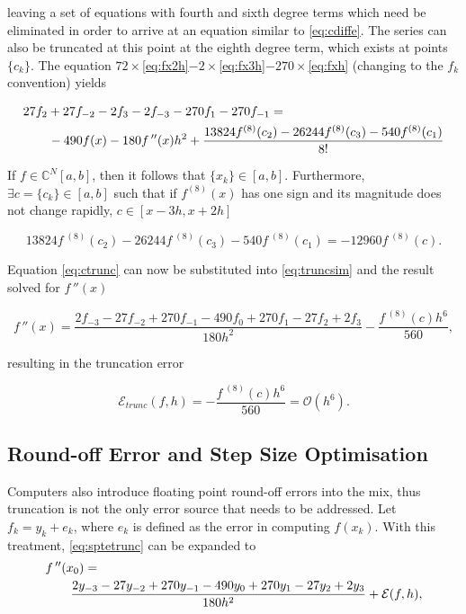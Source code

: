 leaving a set of equations with fourth and sixth degree terms which need be eliminated in order to arrive at an equation similar to \cref{eq:cdiffe}.
The series can also be truncated at this point at the eighth degree term, which exists at points $\{c_k\}$.
The equation $72\times$\cref{eq:fx2h}$-2\times$\cref{eq:fx3h}$-270\times$\cref{eq:fxh} (changing to the $f_k$ convention) yields

{\mathindent=0.2cm
\begin{align}
\MoveEqLeft 27f_{2}+27f_{-2}-2f_{3}-2f_{-3}-270f_{1}-270f_{-1} = \nonumber\\
&-490f(x)-180f\,''(x)h^2+\frac{13824f^{(8)}(c_2)-26244f^{(8)}(c_3)-540f^{(8)}(c_1)}{8!}\label{eq:truncsim}
\end{align}
}

If $f \in \mathds{C}^N [a,b]$, then it follows that $\{x_k\} \in [a,b]$.
Furthermore, $\exists c = \{c_k\} \in [a,b]$ such that if $f^{(8)}(x)$ has one sign and its magnitude does not change rapidly, $c \in [x-3h,x+2h]$

\begin{equation}
 13824f^{\;(8)}(c_2)-26244f^{\;(8)}(c_3)-540f^{\;(8)}(c_1) = -12960f^{\;(8)}(c).\label{eq:ctrunc}
\end{equation}

Equation \cref{eq:ctrunc} can now be substituted into \cref{eq:truncsim} and the result solved for $f\,''(x)$

{\mathindent=0.5cm
\begin{equation}
f\,''(x) = \frac{2f_{-3}-27f_{-2}+270f_{-1}-490f_{0}+270f_{1}-27f_{2}+2f_{3}}{180h^{2}}-\frac{f^{\;(8)}(c)h^6}{560},\label{eq:sptetrunc}
\end{equation}
}

resulting in the truncation error

\begin{equation}
\mathcal{E}_{trunc}(f,h) = -\frac{f^{\;(8)}(c)h^6}{560} = \mathcal{O}(h^6).\label{eq:etrunc}
\end{equation}

\subsection{Round-off Error and Step Size Optimisation}\label{sec:cdiffstep}

Computers also introduce floating point round-off errors into the mix, thus truncation is not the only error source that needs to be addressed.
Let $f_k = y_k +e_k$, where $e_k$ is defined as the error in computing $f(x_k)$. With this treatment, \cref{eq:sptetrunc} can be expanded to
\begin{align}
\MoveEqLeft f\,''(x_0) = \nonumber\\
&\frac{2y_{-3}-27y_{-2}+270y_{-1}-490y_{0}+270y_{1}-27y_{2}+2y_{3}}{180h^{2}}+\mathcal{E}(f,h),\label{eq:sptye}
\end{align}

